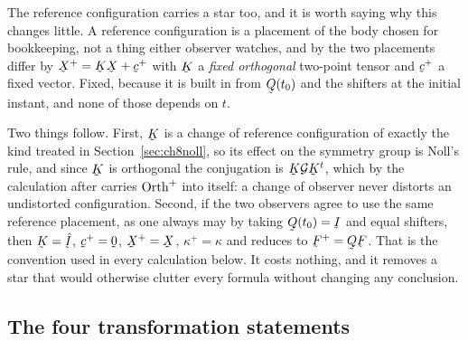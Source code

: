 \begin{remark}\label{rem:ch8starkappa}
The reference configuration carries a star too, and it is worth saying
why this changes little. A reference configuration is a placement of the
body chosen for bookkeeping, not a thing either observer watches, and by
 the two placements differ by $\bX^{+}=\bK\bX+\bc^{+}$ with
$\bK$ a \emph{fixed orthogonal} two-point tensor and $\bc^{+}$ a fixed
vector. Fixed, because it is built in  from $\bQ(t_{0})$ and
the shifters at the initial instant, and none of those depends on $t$.

Two things follow. First, $\bK$ is a change of reference configuration
of exactly the kind treated in Section~\ref{sec:ch8noll}, so its effect
on the symmetry group is Noll's rule, and since $\bK$ is orthogonal the
conjugation is $\bK\mathcal{G}\bK^{t}$, which by the calculation after
 carries $\operatorname{Orth}^{+}$ into itself: a change of observer never
distorts an undistorted configuration. Second, if the two observers
agree to use the same reference placement, as one always may by taking
$\bQ(t_{0})=\I$ and equal shifters, then $\bK=\hI$, $\bc^{+}=\bze$,
$\bX^{+}=\bX$, $\kappa^{+}=\kappa$ and  reduces to
$\bF^{+}=\bQ\bF$. That is the convention used in every calculation
below. It costs nothing, and it removes a star that would otherwise
clutter every formula without changing any conclusion.
\end{remark}

\subsection*{The four transformation statements}

